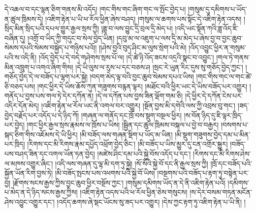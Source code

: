 དེ་འཆལ་བ་དང་ལྷན་ཅིག་གནས་མི་འདོད། །གང་གིས་གང་ཞིག་གང་ལ་སྤོང་བྱེད་པ། །གསུམ་དུ་དམིགས་པ་ཡོད་ན་ཚུལ་ཁྲིམས་དེ། །འཇིག་རྟེན་པ་ཡི་ཕ་རོལ་ཕྱིན་ཞེས་བཤད། །གསུམ་ལ་ཆགས་པས་སྟོང་དེ་འཇིག་རྟེན་འདས། །སྲིད་མིན་སྲིད་པའི་དཔལ་གྱུར་རྒྱལ་སྲས་ཀྱི། །ཟླ་བ་ལས་བྱུང་དྲི་བྲལ་དྲི་མེད་པ། །འདི་ཡང་སྟོན་ཀའི་ཟླ་འོད་ཇི་བཞིན་དུ། །འགྲོ་བ་ཡིད་ཀྱི་གདུང་བ་སེལ་བྱེད་ཡིན། །དབུ་མ་ལ་འཇུག་པ་ལས་དྲི་མ་མེད་པ་ཞེས་བྱ་བ་བྱང་ཆུབ་སེམས་དཔའི་སེམས་བསྐྱེད་པ་གཉིས་པའོ།། །།ཤེས་བྱའི་བུད་ཤིང་མ་ལུས་སྲེག་པའི་མེ། །འོད་འབྱུང་ཕྱིར་ན་གསུམ་པའི་ས་འདི་ནི། །འོད་བྱེད་པ་དེ་བདེ་གཤེགས་སྲས་པོ་ལ། །དེ་ཚེ་ཉི་འོད་ཟངས་འདྲའི་སྣང་བ་འབྱུང་། །གལ་ཏེ་གནས་མིན་འཁྲུག་པ་འགའ་ཞིག་གིས། །དེ་ཡི་ལུས་ལ་རུས་པ་དང་བཅས་ཤ །སྲང་རེ་ཡུན་རིང་དུས་སུ་གཅོད་བྱེད་ཀྱང་། །གཅོད་བྱེད་དེ་ལ་བཟོད་པ་ལྷག་པར་སྐྱེ། །བདག་མེད་ལྟ་བའི་བྱང་ཆུབ་སེམས་དཔའ་ཡིས། །གང་གིས་གང་ལ་གང་ཚེ་ཅི་བཅད་པས། །གང་ཕྱིར་དེ་ཡིས་ཆོས་ཀུན་གཟུགས་བརྙན་ལྟར། །མཐོང་བའི་ཕྱིར་ཡང་དེ་ཡིས་བཟོད་པར་འགྱུར། །གནོད་པ་བྱས་པས་གལ་ཏེ་དེར་དཀོན་ན། །དེ་ལ་དཀོན་པས་བྱས་ཟིན་ལྡོག་གམ་ཅི། །དེ་ཕྱིར་དེ་དཀོན་ངེས་པར་འདིར་དོན་མེད། །འཇིག་རྟེན་ཕ་རོལ་ཡང་ནི་འགལ་བར་འགྱུར། །སྔོན་བྱས་མི་དགེའི་ལས་ཀྱི་འབྲས་བུ་གང་། །ཟད་བྱེད་བརྗོད་པར་འདོད་པ་དེ་ཉིད་ཀོ། །གཞན་ལ་གནོད་དང་ཁྲོ་བས་སྡུག་བསྔལ་ཕྱིར། །ས་བོན་ཉིད་དུ་ཇི་ལྟར་ཁྲིད་པར་བྱེད། །གང་ཕྱིར་རྒྱལ་སྲས་རྣམས་ལ་ཁྲོས་པ་ཡིས། །སྦྱིན་དང་ཚུལ་ཁྲིམས་བསྐལ་པ་བྱེ་བ་བརྒྱར། །བསགས་པ་སྐད་ཅིག་གིས་འཇོམས་དེ་ཡི་ཕྱིར། །མི་བཟོད་ལས་གཞན་སྡིག་པ་ཡོད་མ་ཡིན། །མི་སྡུག་གཟུགས་བྱེད་དམ་པ་མིན་པར་ཁྲིད། །རིགས་དང་མི་རིགས་རྣམ་དཔྱོད་འཕྲོག་བྱེད་ཅིང་། །མི་བཟོད་པ་ཡིས་མྱུར་དུ་ངན་འགྲོར་སྐྱུར། །བཟོད་པས་བཤད་ཟིན་དང་འགལ་ཡོན་ཏན་བྱེད། །མཛེས་ཤིང་དམ་པའི་སྐྱེ་བོས་འདོད་པ་དང་། །རིགས་དང་མི་རིགས་ཤེས་ལ་མཁས་འགྱུར་ཞིང་། །འདི་ལས་གཞན་དུ་ལྷ་མི་དག་ཏུ་སྐྱེ། །སོ་སོའི་སྐྱེ་བོ་དང་ནི་རྒྱལ་སྲས་ཀྱི། །ཁྲོ་དང་བཟོད་པའི་སྐྱོན་ཡོན་རིག་བྱས་ཏེ། །མི་བཟོད་སྤངས་པས་འཕགས་པའི་སྐྱེ་བོ་ཡིས། །བསྔགས་པའི་བཟོད་པ་རྟག་ཏུ་བསྟེན་པར་བྱ། །རྫོགས་སངས་རྒྱས་ཀྱིས་བྱང་ཆུབ་ཕྱིར་བསྔོས་ཀྱང་། །གསུམ་དམིགས་ཡོད་ན་དེ་ནི་འཇིག་རྟེན་པའོ། །དམིགས་པ་མེད་ན་དེ་ཉིད་སངས་རྒྱས་ཀྱིས། །འཇིག་རྟེན་འདས་པའི་ཕ་རོལ་ཕྱིན་ཅེས་གསུངས། །ས་དེར་བསམ་གཏན་མངོན་ཤེས་འབྱུང་འགྱུར་དང་། །འདོད་ཆགས་ཞེ་སྡང་ཡོངས་སུ་ཟད་པར་འགྱུར། །དེས་ཀྱང་རྟག་ཏུ་འཇིག་རྟེན་པ་ཡི་ནི། །
